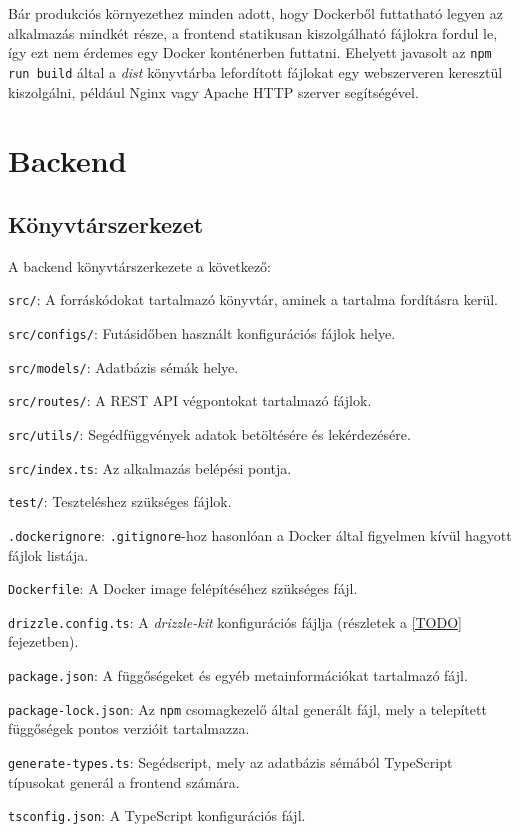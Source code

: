 Bár produkciós környezethez minden adott, hogy Dockerből futtatható legyen az alkalmazás mindkét része, a frontend statikusan kiszolgálható fájlokra fordul le, így ezt nem érdemes egy Docker konténerben futtatni. Ehelyett javasolt az \texttt{npm run build} által a \textit{dist} könyvtárba lefordított fájlokat egy webszerveren keresztül kiszolgálni, például Nginx vagy Apache HTTP szerver segítségével.

\section{Backend}

\subsection{Könyvtárszerkezet}

A backend könyvtárszerkezete a következő:

\begin{compactitem}
    \item \texttt{src/}: A forráskódokat tartalmazó könyvtár, aminek a tartalma fordításra kerül.
    \item \texttt{src/configs/}: Futásidőben használt konfigurációs fájlok helye.
    \item \texttt{src/models/}: Adatbázis sémák helye.
    \item \texttt{src/routes/}: A REST API végpontokat tartalmazó fájlok.
    \item \texttt{src/utils/}: Segédfüggvények adatok betöltésére és lekérdezésére.
    \item \texttt{src/index.ts}: Az alkalmazás belépési pontja.
    \item \texttt{test/}: Teszteléshez szükséges fájlok.
    \item \texttt{.dockerignore}: \texttt{.gitignore}-hoz hasonlóan a Docker által figyelmen kívül hagyott fájlok listája.
    \item \texttt{Dockerfile}: A Docker image felépítéséhez szükséges fájl.
    \item \texttt{drizzle.config.ts}: A \textit{drizzle-kit} konfigurációs fájlja (részletek a \ref{TODO} fejezetben).
    \item \texttt{package.json}: A függőségeket és egyéb metainformációkat tartalmazó fájl.
    \item \texttt{package-lock.json}: Az \texttt{npm} csomagkezelő által generált fájl, mely a telepített függőségek pontos verzióit tartalmazza.
    \item \texttt{generate-types.ts}: Segédscript, mely az adatbázis sémából TypeScript típusokat generál a frontend számára.
    \item \texttt{tsconfig.json}: A TypeScript konfigurációs fájl.
\end{compactitem}

